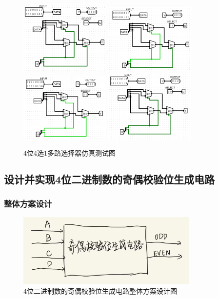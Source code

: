 \documentclass{article}
\begin{document}
    \begin{figure}[H]
    \centering
    \includegraphics[width=0.4\textwidth]{9.2.1.png}
    \includegraphics[width=0.4\textwidth]{9.2.2.png}
    \includegraphics[width=0.4\textwidth]{9.2.3.png}
    \includegraphics[width=0.4\textwidth]{9.2.4.png}
    \caption{4位4选1多路选择器仿真测试图}
    \end{figure}

    \subsection{设计并实现4位二进制数的奇偶校验位生成电路}
    \subsubsection{整体方案设计}
    \begin{figure}[H]
    \centering
    \includegraphics[width=0.8\textwidth]{10.1.png}
    \caption{4位二进制数的奇偶校验位生成电路整体方案设计图}
    \end{figure}
\end{document}
